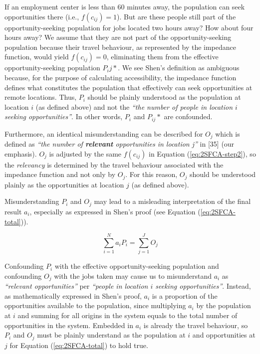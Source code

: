 \documentclass[10pt,letterpaper]{article}
\begin{document}
If an employment center is less than 60 minutes away, the population can
seek opportunities there (i.e., \(f(c_{ij})=1\)). But are these people
still part of the opportunity-seeking population for jobs located two
hours away? How about four hours away? We assume that they are not part
of the opportunity-seeking population because their travel behaviour, as
represented by the impedance function, would yield \(f(c_{ij})=0\),
eliminating them from the effective opportunity-seeking population
\(P_ij*\). We see Shen's definition as ambiguous because, for the
purpose of calculating accessibility, the impedance function defines
what constitutes the population that effectively can seek opportunities
at remote locations. Thus, \(P_i\) should be plainly understood as the
population at location \(i\) (as defined above) and not the \emph{``the
number of people in location \(i\) seeking opportunities''}. In other
words, \(P_i\) and \(P_{ij}*\) are confounded.

Furthermore, an identical misunderstanding can be described for \(O_j\)
which is defined as \emph{``the number of \textbf{relevant}
opportunities in location j''} in {[}35{]} (our emphasis). \(O_j\) is
adjusted by the same \(f(c_{ij})\) in Equation (\ref{eq:2SFCA-step2}),
so the \emph{relevancy} is determined by the travel behaviour associated
with the impedance function and not only by \(O_j\). For this reason,
\(O_j\) should be understood plainly as the opportunities at location
\(j\) (as defined above).

Misunderstanding \(P_i\) and \(O_j\) may lead to a misleading
interpretation of the final result \(a_i\), especially as expressed in
Shen's proof (see Equation (\ref{eq:2SFCA-total})).

\begin{equation}
\label{eq:2SFCA-total}
\sum_{i=1}^N a_{i} P_i= \sum_{j=1}^JO_j
\end{equation}

Confounding \(P_i\) with the effective opportunity-seeking population
and confounding \(O_j\) with the jobs taken may cause us to
misunderstand \(a_{i}\) as \emph{``relevant opportunities''} per
\emph{``people in location \(i\) seeking opportunities''}. Instead, as
mathematically expressed in Shen's proof, \(a_{i}\) is a proportion of
the opportunities available to the population, since multiplying \(a_i\)
by the population at \(i\) and summing for all origins in the system
equals to the total number of opportunities in the system. Embedded in
\(a_i\) is already the travel behaviour, so \(P_i\) and \(O_j\) must be
plainly understand as the population at \(i\) and opportunities at \(j\)
for Equation (\ref{eq:2SFCA-total}) to hold true.
\end{document}
